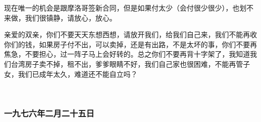 \par 现在唯一的机会是跟摩洛哥签新合同，但是如果付太少（会付很少很少），也划不来做，我们很镇静，请放心，放心。
\par 亲爱的双亲，你们不要天天东想西想，请放开我们，给我们自己来，我们不能再收你们的钱，如果房子付不出，可以卖掉，还是有出路，不是太坏的事，你们不要再焦急，不要担心，过一阵子马上会好转的。总之你们不要再背十字架了，我知道我们台湾房子卖不掉，租不出，爹爹眼睛不好，我们自己家也很困难，不能再管子女，我们已成年太久，难道还不能自立吗？
\par  
\par {}



\subsubsection{一九七六年二月二十五日}

